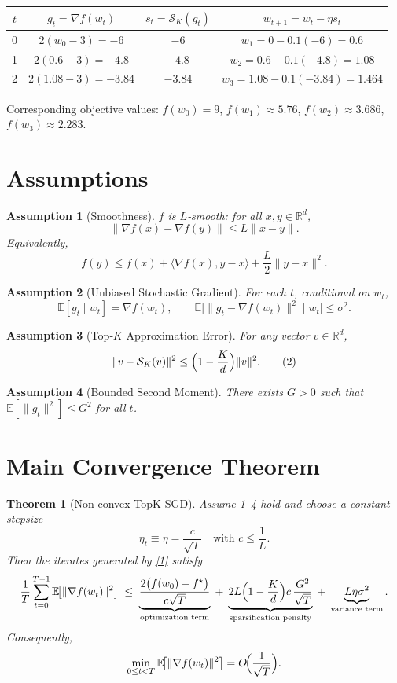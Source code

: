 \documentclass{article}
\newtheorem{theorem}{Theorem}
\newtheorem{assumption}{Assumption}
\newcommand{\E}{\mathbb{E}}
\newcommand{\R}{\mathbb{R}}
\newcommand{\topk}{\mathcal{S}_K}
\begin{document}
\begin{center}
\begin{tabular}{c|c|c|c}
$t$ & $g_{t}= \nabla f(w_{t})$ & $s_{t}= \topk(g_{t})$ & $w_{t+1}=w_{t}-\eta s_{t}$\\ \hline
0 & $2(w_{0}-3)=-6$ & $-6$ & $w_{1}=0-0.1(-6)=0.6$\\
1 & $2(0.6-3)=-4.8$ & $-4.8$ & $w_{2}=0.6-0.1(-4.8)=1.08$\\
2 & $2(1.08-3)=-3.84$ & $-3.84$ & $w_{3}=1.08-0.1(-3.84)=1.464$\\
\end{tabular}
\end{center}
Corresponding objective values: $f(w_{0})=9$, $f(w_{1})\approx5.76$, $f(w_{2})\approx3.686$, $f(w_{3})\approx2.283$.

\newpage

\section*{Assumptions}
\begin{assumption}[Smoothness]\label{as:smooth}
$f$ is $L$‑smooth: for all $x,y\in\R^{d}$,
\[
\|\nabla f(x)-\nabla f(y)\|\le L\|x-y\|.
\]
Equivalently,
\[
f(y)\le f(x)+\langle\nabla f(x),y-x\rangle+\frac{L}{2}\|y-x\|^{2}.
\] 
\end{assumption}

\begin{assumption}[Unbiased Stochastic Gradient]\label{as:unbiased}
For each $t$, conditional on $w_{t}$,
\[
\E[g_{t}\mid w_{t}]=\nabla f(w_{t}),\qquad 
\E\big[\|g_{t}-\nabla f(w_{t})\|^{2}\mid w_{t}\big]\le\sigma^{2}.
\]
\end{assumption}

\begin{assumption}[Top‑$K$ Approximation Error]\label{as:topk}
For any vector $v\in\R^{d}$,
\[
\|v-\topk(v)\|^{2}\le\Bigl(1-\frac{K}{d}\Bigr)\|v\|^{2}.
\tag{2}
\]
\end{assumption}

\begin{assumption}[Bounded Second Moment]\label{as:bounded}
There exists $G>0$ such that $\E[\|g_{t}\|^{2}]\le G^{2}$ for all $t$.
\end{assumption}

\section*{Main Convergence Theorem}
\begin{theorem}[Non‑convex TopK‑SGD]\label{thm:main}
Assume \ref{as:smooth}–\ref{as:bounded} hold and choose a constant stepsize
\[
\eta_{t}\equiv \eta=\frac{c}{\sqrt{T}}\quad\text{with }c\le\frac{1}{L}.
\]
Then the iterates generated by \eqref{1} satisfy
\[
\frac{1}{T}\sum_{t=0}^{T-1}\E\!\big[\|\nabla f(w_{t})\|^{2}\big]
\;\le\;
\underbrace{\frac{2\big(f(w_{0})-f^{\star}\big)}{c\sqrt{T}}}_{\text{optimization term}}
\;+\;
\underbrace{2L\Bigl(1-\frac{K}{d}\Bigr)c\,\frac{G^{2}}{\sqrt{T}}}_{\text{sparsification penalty}}
\;+\;
\underbrace{L\eta\sigma^{2}}_{\text{variance term}} .
\]
Consequently,
\[
\min_{0\le t<T}\E\!\big[\|\nabla f(w_{t})\|^{2}\big]=O\!\Bigl(\frac{1}{\sqrt{T}}\Bigr).
\]
\end{theorem}
\end{document}
